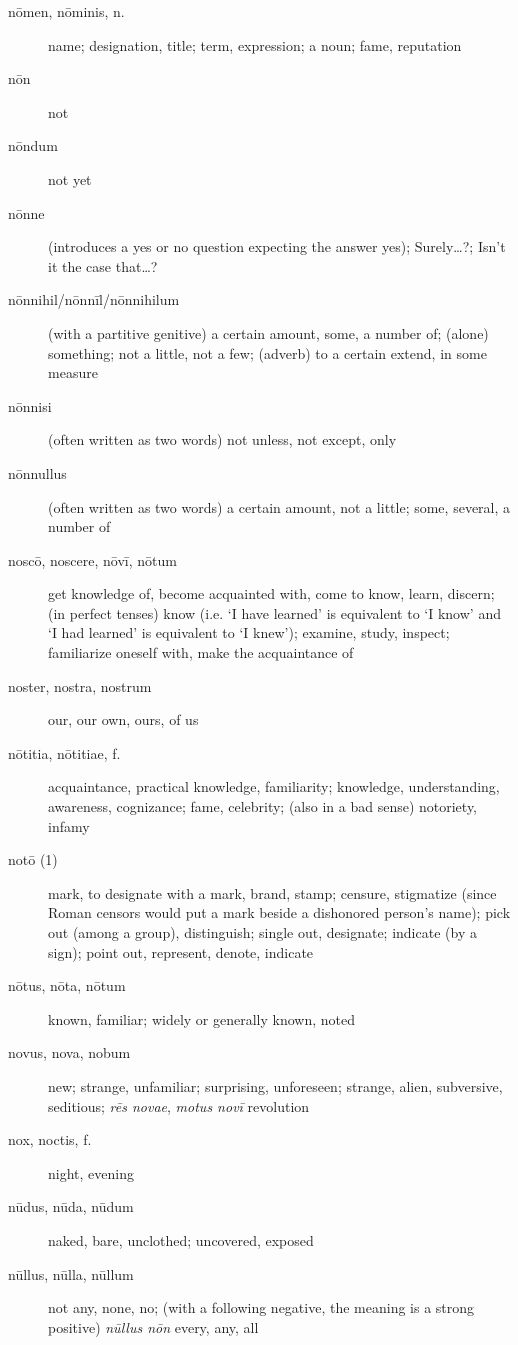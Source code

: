 \begin{description}
    \item[nōmen, nōminis, n.] \marginnote{*}name; designation, title; term, expression; a noun; fame, reputation
    \item[nōn] \marginnote{*}not
    \item[nōndum] \marginnote{*}not yet
    \item[nōnne] \marginnote{*}(introduces a yes or no question expecting the answer yes); Surely\dots ?; Isn't it the case that\dots ?
    \item[nōnnihil/nōnnīl/nōnnihilum] (with a partitive genitive) a certain amount, some, a number of; (alone) something; not a little, not a few; (adverb) to a certain extend, in some measure
    \item[nōnnisi] (often written as two words) not unless, not except, only
    \item[nōnnullus] (often written as two words) a certain amount, not a little; some, several, a number of
    \item[noscō, noscere, nōvī, nōtum] \marginnote{*}get knowledge of, become acquainted with, come to know, learn, discern; (in perfect tenses) know (i.e. `I have learned' is equivalent to `I know' and `I had learned' is equivalent to `I knew'); examine, study, inspect; familiarize oneself with, make the acquaintance of
    \item[noster, nostra, nostrum] \marginnote{*}our, our own, ours, of us
    \item[nōtitia, nōtitiae, f.] acquaintance, practical knowledge, familiarity; knowledge, understanding, awareness, cognizance; fame, celebrity; (also in a bad sense) notoriety, infamy
    \item[notō (1)] mark, to designate with a mark, brand, stamp; censure, stigmatize (since Roman censors would put a mark beside a dishonored person's name); pick out (among a group), distinguish; single out, designate; indicate (by a sign); point out, represent, denote, indicate
    \item[nōtus, nōta, nōtum] \marginnote{*}known, familiar; widely or generally known, noted
    \item[novus, nova, nobum] \marginnote{*}new; strange, unfamiliar; surprising, unforeseen; strange, alien, subversive, seditious; \textit{rēs novae}, \textit{motus novī} revolution
    \item[nox, noctis, f.] \marginnote{*}night, evening
    \item[nūdus, nūda, nūdum] \marginnote{*}naked, bare, unclothed; uncovered, exposed
    \item[nūllus, nūlla, nūllum] \marginnote{*}not any, none, no; (with a following negative, the meaning is a strong positive) \textit{nūllus nōn} every, any, all

\end{description}
